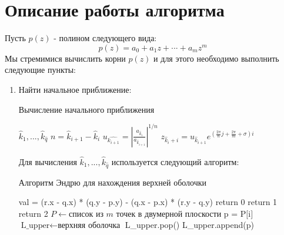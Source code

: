 \documentclass[a4paper,12pt]{article}
\begin{document}
\section{Описание работы алгоритма}
Пусть $p(z)$ - полином следующего вида:
$$p(z) = a_0 + a_{1}z + \text{···} + a_{m}z^{m}$$
Мы стремимися вычислить корни $p(z)$ и для этого необходимо выполнить следующие пункты:
\begin{enumerate}
    \item Найти начальное приближение:
        \begin{algorithm}
            \caption{Вычисление начального приближения}\label{alg:Example}
            \begin{algorithmic}
            \State {} $\hat{k}_1,\text{...}, \hat{k}_{\hat{q}}$  
                \State $n=\hat{k}_{i+1}-\hat{k}_i$
                \State $u_{\hat{k_{i+1}}}=\left| \frac{a_{\hat{k}_i}}{a_{\hat{k}_{i+1}}} \right|^{1/n}$
                    \State $z_{\hat{k}_{i} + i} = u_{\hat{k}_{i+1}}e^{\left(\frac{2\pi}{n}j + \frac{2\pi}{m} + \sigma\right)i}$
                \EndFor
            \EndFor 
            \end{algorithmic}
        \end{algorithm}

        Для вычисления $\hat{k}_1,\text{...}, \hat{k}_{\hat{q}}$ используется следующий алгоритм:
        \begin{algorithm}[H]
            \caption{Алгоритм Эндрю для нахождения верхней оболочки}\label{alg:Example}
            \begin{algorithmic}
            \State {}
                \State val = (r.x - q.x) * (q.y - p.y)  - (q.x - p.x) * (r.y - q.y)
                    \State return 0
                    \State return 1
                \Else
                    \State return 2
                \EndIf
            \EndFunction
            \State
            \State $P\gets \text{список из $m$ точек в двумерной плоскости}$
            \State {}
                \State $\text{p = P[i]}$
                \State $\text{L\_upper} \gets \text{верхняя оболочка}$
                \State {}
                \State {}
                    \State L\_upper.pop()
                \EndWhile
                \State L\_upper.append(p)
            \EndFor
            \end{algorithmic}
        \end{algorithm}




\end{enumerate}
\end{document}
